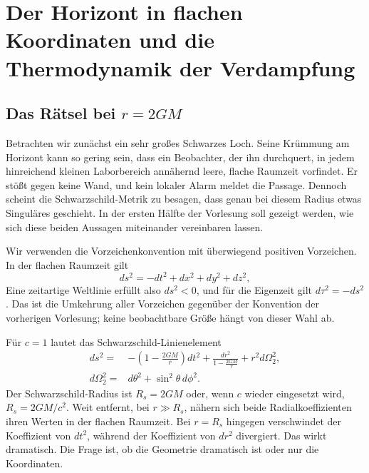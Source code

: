 \chapter{Der Horizont in flachen Koordinaten und die Thermodynamik der Verdampfung}


\section{Das Rätsel bei \texorpdfstring{\(r=2GM\)}{r=2GM}}

Betrachten wir zunächst ein sehr großes Schwarzes Loch. Seine Krümmung am Horizont kann so gering sein, dass ein Beobachter, der ihn durchquert, in jedem hinreichend kleinen Laborbereich annähernd leere, flache Raumzeit vorfindet. Er stößt gegen keine Wand, und kein lokaler Alarm meldet die Passage. Dennoch scheint die Schwarzschild-Metrik zu besagen, dass genau bei diesem Radius etwas Singuläres geschieht. In der ersten Hälfte der Vorlesung soll gezeigt werden, wie sich diese beiden Aussagen miteinander vereinbaren lassen.

Wir verwenden die Vorzeichenkonvention mit überwiegend positiven Vorzeichen. In der flachen Raumzeit gilt
\begin{equation}
ds^2=-dt^2+dx^2+dy^2+dz^2,
\end{equation}
Eine zeitartige Weltlinie erfüllt also \(ds^2<0\), und für die Eigenzeit gilt \(d\tau^2=-ds^2\). Das ist die Umkehrung aller Vorzeichen gegenüber der Konvention der vorherigen Vorlesung; keine beobachtbare Größe hängt von dieser Wahl ab.

Für \(c=1\) lautet das Schwarzschild-Linienelement
\begin{equation}
\begin{aligned}
ds^2={}&-\left(1-\frac{2GM}{r}\right)dt^2
+\frac{dr^2}{1-\frac{2GM}{r}}
+r^2d\Omega_2^2,\\
d\Omega_2^2={}&d\theta^2+\sin^2\theta\,d\phi^2 .
\end{aligned}
\label{eq:l03-schwarzschild}
\end{equation}
Der Schwarzschild-Radius ist \(R_s=2GM\) oder, wenn \(c\) wieder eingesetzt wird, \(R_s=2GM/c^2\). Weit entfernt, bei \(r\gg R_s\), nähern sich beide Radialkoeffizienten ihren Werten in der flachen Raumzeit. Bei \(r=R_s\) hingegen verschwindet der Koeffizient von \(dt^2\), während der Koeffizient von \(dr^2\) divergiert. Das wirkt dramatisch. Die Frage ist, ob die Geometrie dramatisch ist oder nur die Koordinaten.

